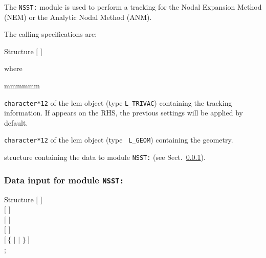 The {\tt NSST:} module is used to perform a {\sc tracking} for the Nodal
Expansion Method (NEM)\cite{nestle} or the Analytic Nodal Method (ANM)\cite{anm08}.

\vskip 0.08cm

The calling specifications are:

\begin{DataStructure}{Structure }
 \moc{:=}  $[$  $]$   \moc{::} 
\end{DataStructure}

\goodbreak
\noindent where
\begin{ListeDeDescription}{mmmmmm}

\item[\dusa{TRACK}] {\tt character*12} of the {\sc lcm} object (type {\tt L\_TRIVAC}) 
containing the {\sc tracking} information. If  appears on the RHS, the
previous settings will be applied by default.

\item[\dusa{GEOM}] {\tt character*12} of the {\sc lcm} object (type {\tt
L\_GEOM}) containing the geometry.

\item[\dstr{NSST\_data}] structure containing the data to module {\tt NSST:} (see Sect.~\ref{sect:NSST_data}).

\end{ListeDeDescription}

\subsubsection{Data input for module {\tt NSST:}}\label{sect:NSST_data}

\begin{DataStructure}{Structure }
$[$   $]$ \\
$[$   $]$ \\
$[$   $]$ \\
$[$   $]$ \\
$[~\{$  $|$  $|$  $\}~]$ \\
;
\end{DataStructure}

